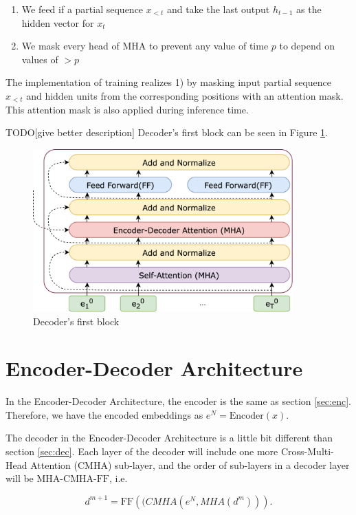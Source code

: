 \begin{enumerate}
    \item We feed if a partial sequence $x_{<t}$ and take the last output $h_{t-1}$ as the hidden vector for $x_t$
    \item We mask every head of $\mathrm{MHA}$ to prevent any value of time $p$ to depend on values of $>p$
\end{enumerate}

The implementation of training realizes 1) by masking input partial sequence $x_{<t}$ and hidden units from the corresponding positions with an attention mask. This attention mask is also applied during inference time. 

TODO[give better description] Decoder's first block can be seen in Figure \ref{fig:decoder_block}.

\begin{figure}[h]
    \centering
    \includegraphics[width=10cm]{pages/imgs/decoder_block.png}
    \caption{Decoder's first block}
    \label{fig:decoder_block}
\end{figure}


\section{Encoder-Decoder Architecture}

In the Encoder-Decoder Architecture, the encoder is the same as section \ref{sec:enc}. Therefore, we have the encoded embeddings as $e^N = \mathrm{Encoder}(x)$.

The decoder in the Encoder-Decoder Architecture is a little bit different than section \ref{sec:dec}. Each layer of the decoder will include one more Cross-Multi-Head Attention (CMHA) sub-layer, and the order of sub-layers in a decoder layer will be $\mathrm{MHA}$-$\mathrm{CMHA}$-$\mathrm{FF}$, i.e.

\begin{equation}
    d^{m+1} = \mathrm{FF}(\mathrm(CMHA(e^N, MHA(d^m))).
\end{equation}


